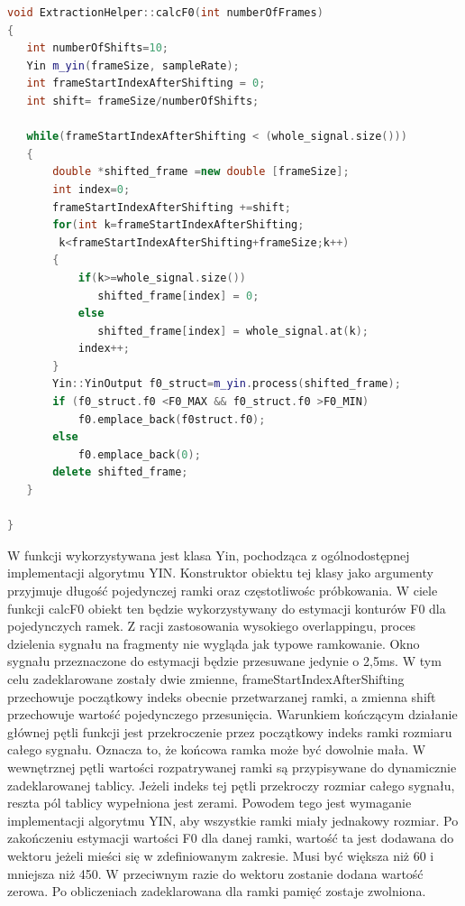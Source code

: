 \documentclass[a4paper,12 pt]{article}
\begin{document}
\FloatBarrier
\newpage
\begin{lstlisting}[caption={Przedstawienie sposobu dokonywania podziału na ramki, wraz z zastosowaniem overlappingu},label={lst:label},language=C++]
void ExtractionHelper::calcF0(int numberOfFrames)
{
   int numberOfShifts=10;
   Yin m_yin(frameSize, sampleRate);
   int frameStartIndexAfterShifting = 0;
   int shift= frameSize/numberOfShifts;

   while(frameStartIndexAfterShifting < (whole_signal.size()))
   {
       double *shifted_frame =new double [frameSize];
       int index=0;
       frameStartIndexAfterShifting +=shift;
       for(int k=frameStartIndexAfterShifting;
		k<frameStartIndexAfterShifting+frameSize;k++)
       {
           if(k>=whole_signal.size())
              shifted_frame[index] = 0;
           else
              shifted_frame[index] = whole_signal.at(k);
           index++;
       }
       Yin::YinOutput f0_struct=m_yin.process(shifted_frame);
       if (f0_struct.f0 <F0_MAX && f0_struct.f0 >F0_MIN)
           f0.emplace_back(f0struct.f0);
       else
           f0.emplace_back(0);
       delete shifted_frame;
   }

}
\end{lstlisting}
W funkcji wykorzystywana jest klasa Yin, pochodząca z ogólnodostępnej implementacji algorytmu YIN. Konstruktor obiektu tej klasy jako argumenty przyjmuje długość pojedynczej ramki oraz częstotliwośc próbkowania.
W ciele funkcji calcF0 obiekt ten będzie wykorzystywany do estymacji konturów F0 dla pojedynczych ramek. 
Z racji zastosowania wysokiego overlappingu, proces dzielenia sygnału na fragmenty nie wygląda jak typowe ramkowanie. Okno sygnału przeznaczone do estymacji będzie przesuwane jedynie o 2,5ms.
W tym celu zadeklarowane zostały dwie zmienne, frameStartIndexAfterShifting przechowuje początkowy indeks obecnie przetwarzanej ramki, a zmienna shift przechowuje wartość pojedynczego przesunięcia.
Warunkiem kończącym działanie głównej pętli funkcji jest przekroczenie przez początkowy indeks ramki rozmiaru całego sygnału. Oznacza to, że końcowa ramka może być dowolnie mała.
W wewnętrznej pętli wartości rozpatrywanej ramki są przypisywane do dynamicznie zadeklarowanej tablicy. Jeżeli indeks tej pętli przekroczy rozmiar całego sygnału, reszta pól tablicy wypełniona jest zerami. Powodem tego jest wymaganie implementacji algorytmu YIN, aby wszystkie ramki miały jednakowy rozmiar.
Po zakończeniu estymacji wartości F0 dla danej ramki, wartość ta jest dodawana do wektoru jeżeli mieści się w zdefiniowanym zakresie. Musi być większa niż 60 i mniejsza niż 450. W przeciwnym razie do wektoru zostanie dodana wartość zerowa. Po obliczeniach zadeklarowana dla ramki pamięć zostaje zwolniona.
\end{document}
